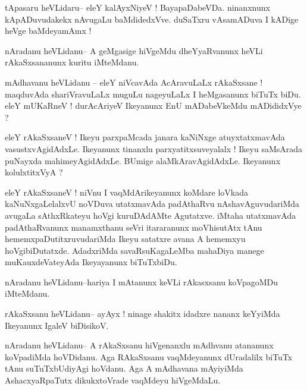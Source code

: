 \documentclass{article}
\begin{document}
\begin{mn}%
tApasaru heVLidaru-- eleY kalAyxNiyeV ! BayapaDabeVDa. ninanxnunx kApADuvudakekx nAvugaLu 
baMdidedxVve. duSaTxru vAsamADuva I kADige heVge baMdeyamAmx !
\end{mn}

\begin{mn}%
nAradanu heVLidanu-- A geMgasige hiVgeMdu dheYyaRvanunx heVLi rAkaSxsananunx kuritu iMteMdanu.
\end{mn}

\begin{mn}%
mAdhavanu heVLidanu -- eleY niVcavAda AcAravuLaLx rAkaSxsane ! maqduvAda shariVravuLaLx 
muguLu nageyuLaLx I heMgasanunx biTuTx biDu. eleY mUKaRneV ! durAcAriyeV Ikeyanunx EnU 
mADabeVkeMdu mADididxVye ?
\end{mn}

\begin{mn}%
eleY rAkaSxsaneV ! Ikeyu parxpaMcada janara kaNiNxge atuyxtatxmavAda vasustxvAgidAdxLe. 
Ikeyanunx tinanxlu parxyatitxsuveyalalx ! Ikeyu saMsArada puNayxda mahimeyAgidAdxLe. BUmige 
alaMkAravAgidAdxLe. Ikeyanunx kolulxtitxVyA ?
\end{mn}

\begin{mn}%
eleY rAkaSxsaneV ! niVnu I vaqMdArikeyanunx koMdare loVkada kaNuNxgaLelalxvU noVDuva 
utatxmavAda padAthaRvu nAshavAguvudariMda avugaLa sAthxRkateyu hoVgi kuruDAdAMte Agutatxve. 
iMtaha utatxmavAda padAthaRvanunx manamxthanu seVri itararanunx moVhisutAtx tAnu 
hememxpaDutitxruvudariMda Ikeyu satatxre avana A hememxyu hoVgibiDutatxde. AdadxriMda 
savaRsuKagaLeMba mahaDiya manege muKauxdeVateyAda Ikeyayanunx biTuTxbiDu.
\end{mn}

\begin{mn}%
nAradanu heVLidanu--hariya I mAtanunx keVLi rAkasxsanu koVpagoMDu iMteMdanu.
\end{mn}

\begin{mn}%
rAkaSxsanu heVLidanu-- ayAyx ! ninage shakitx idadxre nananx keYyiMda Ikeyanunx IgaleV 
biDisikoV.
\end{mn}

\begin{mn}%
nAradanu heVLidanu-- A rAkaSxsanu hiVgenanxlu mAdhvanu atananunx koVpadiMda hoVDidanu. Aga 
RAkaSxsanu vaqMdeyanunx dUradalilx biTuTx tAnu suTuTxbUdiyAgi hoVdanu. Aga A mAdhavana 
mAyiyiMda AshacxyaRpaTutx dikukxtoVrade vaqMdeyu hiVgeMdaLu.
\end{mn}
\end{document}
